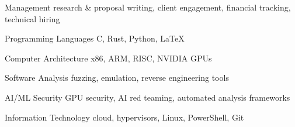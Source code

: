 

\begin{cvskills}
  \cvskill
    {Management} %
    {research \& proposal writing, client engagement, financial tracking, technical hiring} %

  \cvskill
    {Programming Languages} %
    {C, Rust, Python, LaTeX} %

  \cvskill
    {Computer Architecture} %
    {x86, ARM, RISC, NVIDIA GPUs} %

  \cvskill
    {Software Analysis} %
    {fuzzing, emulation, reverse engineering tools} %

    \cvskill
    {AI/ML Security} %
    {GPU security, AI red teaming, automated analysis frameworks} %

  \cvskill
    {Information Technology} %
    {cloud, hypervisors, Linux, PowerShell, Git} %

\end{cvskills}
